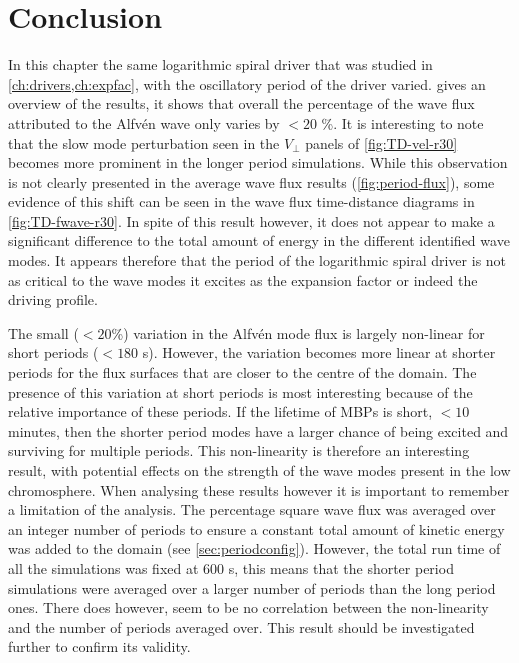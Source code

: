 \documentclass[a4paper,12pt,fourier,authoryear,custommargin]{Classes/PhDThesisPSnPDF}
\providecommand{\DIFaddtex}[1]{{\protect\color{blue}\uwave{#1}}} %
\providecommand{\DIFaddbegin}{} %
\providecommand{\DIFaddend}{} %
\providecommand{\DIFadd}[1]{\texorpdfstring{\DIFaddtex{#1}}{#1}} %
\begin{document}
\section{Conclusion}\label{sec:conclusion}

In this chapter the same logarithmic spiral driver that was studied in \cref{ch:drivers,ch:expfac}, with the oscillatory period of the driver varied.
 gives an overview of the results, it shows that overall the percentage of the wave flux attributed to the Alfv\'en wave only varies by $<20$ \%.
It is interesting to note that the slow mode perturbation seen in the $V_\perp$ panels of \cref{fig:TD-vel-r30} becomes more prominent in the longer period simulations.
While this observation is not clearly presented in the average wave flux results (\cref{fig:period-flux}), some evidence of this shift can be seen in the wave flux time-distance diagrams in \cref{fig:TD-fwave-r30}.
In spite of this result however, it does not appear to make a significant difference to the total amount of energy in the different identified wave modes.
It appears therefore that the period of the logarithmic spiral driver is not as critical to the wave modes it excites as the expansion factor or indeed the driving profile.

The small ($<20$\%) variation in the Alfv\'en mode flux is largely non-linear for short periods ($<180$ s).
However, the variation becomes more linear at shorter periods for the flux surfaces that are closer to the centre of the domain.
The presence of this variation at short periods is most interesting because of the relative importance of these periods.
If the lifetime of MBPs is short, $<10$ minutes\DIFaddbegin \DIFadd{~}\DIFaddend \citep{sanchezalmeida2004}, then the shorter period modes have a larger chance of being excited and surviving for multiple periods.
This non-linearity is therefore an interesting result, with potential effects on the strength of the wave modes present in the low chromosphere.
When analysing these results however it is important to remember a limitation of the analysis.
The percentage square wave flux was averaged over an integer number of periods to ensure a constant total amount of kinetic energy was added to the domain (see \cref{sec:periodconfig}).
However, the total run time of all the simulations was fixed at $600$ s, this means that the shorter period simulations were averaged over a larger number of periods than the long period ones.
There does however, seem to be no correlation between the non-linearity and the number of periods averaged over.
This result should be investigated further to confirm its validity.
\end{document}

